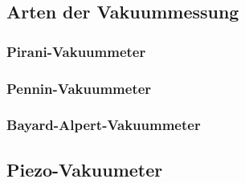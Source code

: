 	\subsection{Arten der Vakuummessung}
		
		\subsubsection{Pirani-Vakuummeter}

		\subsubsection{Pennin-Vakuummeter}

		\subsubsection{Bayard-Alpert-Vakuummeter}
		
		\subsection{Piezo-Vakuumeter}


